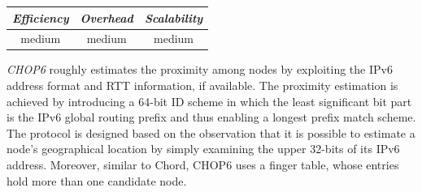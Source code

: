 \begin{center}
\begin{tabular}{ccc}
\emph{Efficiency} & \emph{Overhead} & \emph{Scalability} \\
\hline
medium &
% 
medium &
medium
\end{tabular}
\end{center}

\emph{CHOP6} \cite{MT2007} roughly estimates the proximity among
nodes by exploiting the IPv6 address format and RTT information, if available.
The proximity estimation is achieved by introducing a 64-bit ID scheme in which
the least significant bit part is the IPv6 global routing prefix and thus
enabling a longest prefix match scheme. The protocol is designed based on the
observation that it is possible to estimate a node's geographical location by
simply examining the upper 32-bits of its IPv6 address. Moreover, similar to
Chord\cite{stoica_chord_2001}, CHOP6 uses a finger table, whose entries hold
more than one candidate node.

%
%


